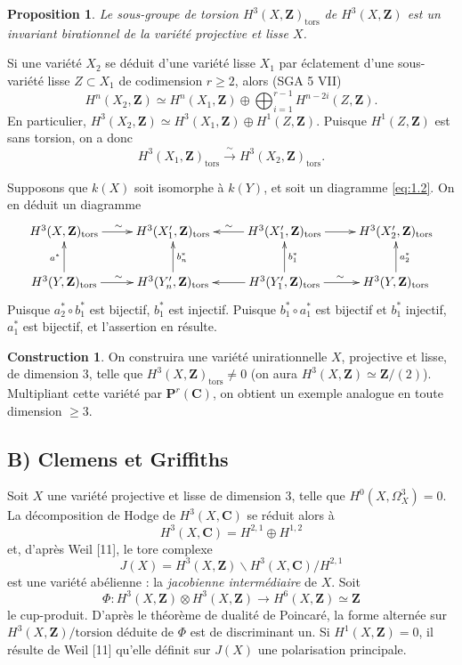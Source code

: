 \documentclass[12pt]{amsart}
\theoremstyle{plain}
\newtheorem{proposition}[theoreme]{Proposition}
\theoremstyle{definition}
\newtheorem{construction}[theoreme]{Construction}
\theoremstyle{remark}
\begin{document}
\begin{proposition}\label{prop:2.1}
Le sous-groupe de torsion $H^3(X, \mathbf{Z})_{\text{tors}}$ de $H^3(X, \mathbf{Z})$ est un
invariant birationnel de la vari\'et\'e projective et lisse $X$.
\end{proposition}

Si une vari\'et\'e $X_2$ se d\'eduit d'une vari\'et\'e lisse $X_1$ par \'eclatement d'une
sous-vari\'et\'e lisse $Z \subset X_1$ de codimension $r \geqslant 2$, alors (SGA 5 VII)
\[
H^n(X_2, \mathbf{Z}) \simeq H^n(X_1, \mathbf{Z}) \oplus \bigoplus_{i=1}^{r-1} H^{n-2i}(Z, \mathbf{Z}).
\]
En particulier, $H^3(X_2, \mathbf{Z}) \simeq H^3(X_1, \mathbf{Z}) \oplus H^1(Z, \mathbf{Z})$. Puisque $H^1(Z, \mathbf{Z})$ est sans
torsion, on a donc
\[
H^3(X_1, \mathbf{Z})_{\text{tors}} \xrightarrow{\;\sim\;} H^3(X_2, \mathbf{Z})_{\text{tors}}.
\]

Supposons que $k(X)$ soit isomorphe \`a $k(Y)$, et soit un diagramme \eqref{eq:1.2}. On en
d\'eduit un diagramme
\[
\xymatrix{
H^3(X, \mathbf{Z})_{\text{tors}} \ar[r]^{\sim} & H^3(X_1', \mathbf{Z})_{\text{tors}} & H^3(X_1', \mathbf{Z})_{\text{tors}} \ar[l]_{\sim} \ar[r] & H^3(X_2', \mathbf{Z})_{\text{tors}} \\
H^3(Y, \mathbf{Z})_{\text{tors}} \ar[r]^{\sim} \ar[u]^{a^*} & H^3(Y_n', \mathbf{Z})_{\text{tors}} \ar[u]_{b_n^*} & H^3(Y_1', \mathbf{Z})_{\text{tors}} \ar[l] \ar[r]^{\sim} \ar[u]_{b_1^*} & H^3(Y, \mathbf{Z})_{\text{tors}} \ar[u]_{a_2^*}
}
\]
Puisque $a_2^* \circ b_1^*$ est bijectif, $b_1^*$ est injectif. Puisque $b_1^* \circ a_1^*$ est bijectif
et $b_1^*$ injectif, $a_1^*$ est bijectif, et l'assertion en r\'esulte.

\begin{construction}\label{cons:2.2}
On construira une vari\'et\'e unirationnelle $X$, projective et lisse, de dimension $3$,
telle que $H^3(X, \mathbf{Z})_{\text{tors}} \neq 0$ (on aura $H^3(X, \mathbf{Z}) \simeq \mathbf{Z}/(2)$).
Multipliant cette vari\'et\'e par $\mathbf{P}^r(\mathbf{C})$, on obtient un exemple analogue en toute
dimension $\geqslant 3$.
\end{construction}

\subsection*{B) Clemens et Griffiths}

Soit $X$ une vari\'et\'e projective et lisse de dimension $3$, telle que
$H^0(X, \Omega_X^3) = 0$. La d\'ecomposition de Hodge de $H^3(X, \mathbf{C})$ se r\'eduit alors \`a
\[
H^3(X, \mathbf{C}) = H^{2,1} \oplus H^{1,2}
\]
et, d'apr\`es Weil [11], le tore complexe
\[
J(X) = H^3(X, \mathbf{Z}) \backslash H^3(X, \mathbf{C}) / H^{2,1}
\]
est une vari\'et\'e ab\'elienne : la \textit{jacobienne interm\'ediaire} de $X$. Soit
\[
\Phi : H^3(X, \mathbf{Z}) \otimes H^3(X, \mathbf{Z}) \to H^6(X, \mathbf{Z}) \simeq \mathbf{Z}
\]
le cup-produit. D'apr\`es le th\'eor\`eme de dualit\'e de Poincar\'e, la forme altern\'ee sur
$H^3(X, \mathbf{Z})/\text{torsion}$ d\'eduite de $\Phi$ est de discriminant un. Si $H^1(X, \mathbf{Z}) = 0$, il
r\'esulte de Weil [11] qu'elle d\'efinit sur $J(X)$ une polarisation principale.
\end{document}
